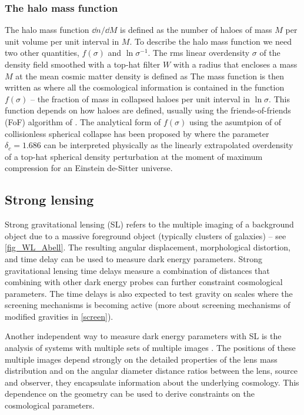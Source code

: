 \subsubsection{The halo mass function}
The halo mass function $\dd n/\dd M$ is defined as the number of haloes of mass $M$ per unit volume per unit interval in $M$. To describe the halo mass function we need two other quantities, $f(\sigma)$ and $\ln\sigma^{-1}$. The rms linear overdensity $\sigma$ of the density field smoothed with a top-hat filter $W$ with a radius that encloses a mass $M$ at the mean cosmic matter density is defined as
The mass function is then written as
where all the cosmological information is contained in the function \(f(\sigma)\) --  the fraction of mass in collapsed haloes per unit interval in $\ln\sigma$. This function depends on how haloes are defined, usually using the friends-of-friends (FoF) algorithm of \textcite{1985ApJ...292..371D}. The analytical form of $f(\sigma)$ using the asumtpion of of collisionless spherical collapse has been proposed by \textcite{1974ApJ...187..425P}
where the parameter \(\delta_c=1.686\) can be interpreted physically as the linearly extrapolated overdensity of a top-hat spherical density perturbation at the moment of maximum compression for an Einstein de-Sitter universe.
\subsection{Strong lensing}
Strong gravitational lensing (SL) refers to the multiple imaging of a background object due to a massive foreground object (typically clusters of galaxies) -- see \autoref{fig_WL_Abell}. The resulting angular displacement, morphological distortion, and time delay can be used to measure dark energy parameters. Strong gravitational lensing time delays measure a combination of distances that combining with other dark energy probes can further constraint cosmological parameters. The time delays is also expected to test gravity on scales where the screening mechanisms is becoming active (more about screening mechanisms of modified gravities in \autoref{screen}).

Another independent way to measure dark energy parameters with SL is the analysis of systems with multiple sets of multiple images \textcite{SL_in_CLGs}. The positions of these multiple images depend strongly on the detailed properties of the lens mass distribution and on the angular diameter distance ratios between the lens, source and observer, they encapsulate information about the underlying cosmology. This dependence on the geometry can be used to derive constraints on the cosmological parameters.
